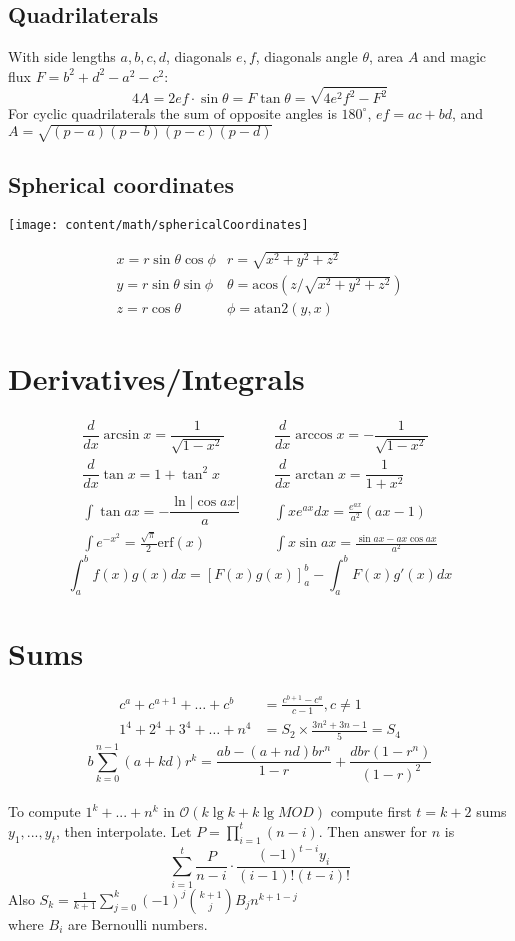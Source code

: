 \subsection{Quadrilaterals}
With side lengths $a,b,c,d$, diagonals $e, f$, diagonals angle $\theta$, area $A$ and
magic flux $F=b^2+d^2-a^2-c^2$:
\[ 4A = 2ef \cdot \sin\theta = F\tan\theta = \sqrt{4e^2f^2-F^2} \]
 For cyclic quadrilaterals the sum of opposite angles is $180^\circ$,
$ef = ac + bd$, and $A = \sqrt{(p-a)(p-b)(p-c)(p-d)}$
\vspace{4mm} %
\subsection{Spherical coordinates}
\begin{center}
\texttt{[image: content/math/sphericalCoordinates]}
\end{center}
\[\begin{array}{cc}
x = r\sin\theta\cos\phi & r = \sqrt{x^2+y^2+z^2}\\
y = r\sin\theta\sin\phi & \theta = \textrm{acos}(z/\sqrt{x^2+y^2+z^2})\\
z = r\cos\theta & \phi = \textrm{atan2}(y,x)
\end{array}\]

\section{Derivatives/Integrals}
{\footnotesize
\begin{align*}
	\dfrac{d}{dx}\arcsin x = \dfrac{1}{\sqrt{1-x^2}} &&& \dfrac{d}{dx}\arccos x = -\dfrac{1}{\sqrt{1-x^2}} \\
	\dfrac{d}{dx}\tan x = 1+\tan^2 x &&& \dfrac{d}{dx}\arctan x = \dfrac{1}{1+x^2} \\
	\int\tan ax = -\dfrac{\ln|\cos ax|}{a} &&& \int xe^{ax}dx = \frac{e^{ax}}{a^2}(ax-1) \\
	\int e^{-x^2} = \frac{\sqrt \pi}{2} \text{erf}(x) &&& \int x\sin ax = \frac{\sin ax-ax \cos ax}{a^2}
\end{align*}}
\[\int_a^bf(x)g(x)dx = [F(x)g(x)]_a^b-\int_a^bF(x)g'(x)dx\]

\section{Sums}
\vspace{-3mm}
\begin{align*}
  c^a + c^{a+1} + \dots + c^{b} &= \frac{c^{b+1} - c^a}{c-1}, c \neq 1\\
	1^4 + 2^4 + 3^4 + \dots + n^4 &= S_2 \times \frac{3n^2 + 3n - 1}{5} = S_4
\end{align*}
\small{
  \[b\sum_{k=0}^{n-1}(a + kd)r^k = \frac{ab - (a + nd)br^n}{1-r} + \frac{dbr(1-r^n)}{(1-r)^2}\]\\}
To compute $1^k + ... + n^k$ in $\mathcal{O}(k\lg k + k \lg MOD)$ compute first $t = k + 2$ sums $y_1, ... , y_t$, then interpolate. Let $P = \prod_{i=1}^{t}(n - i)$. Then answer for $n$ is
\[\sum_{i = 1}^{t} \frac{P}{n - i} \cdot \frac{(-1)^{t - i}y_i}{(i - 1)!(t - i)!}\]
Also $S_k = \frac{1}{k+1}\sum_{j = 0}^{k}(-1)^j\binom{k+1}{j}B_j n^{k + 1 - j}$\\
where $B_i$ are Bernoulli numbers.

